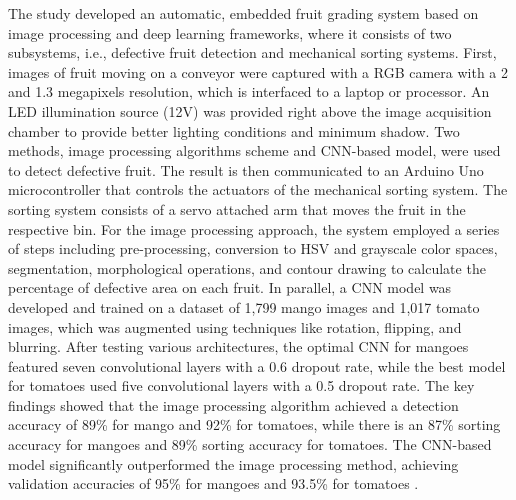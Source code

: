 {

The study developed an automatic, embedded fruit grading system based on image processing and deep learning frameworks, where it consists of two subsystems, i.e., defective fruit detection and mechanical sorting systems. First, images of fruit moving on a conveyor were captured with a RGB camera with a 2 and 1.3 megapixels resolution, which is interfaced to a laptop or processor. An LED illumination source (12V) was provided right above the image acquisition chamber to provide better lighting conditions and minimum shadow. Two methods, image processing algorithms scheme and CNN-based model, were used to detect defective fruit. The result is then communicated to an Arduino Uno microcontroller that controls the actuators of the mechanical sorting system. The sorting system consists of a servo attached arm that moves the fruit in the respective bin. For the image processing approach, the system employed a series of steps including pre-processing, conversion to HSV and grayscale color spaces, segmentation, morphological operations, and contour drawing to calculate the percentage of defective area on each fruit. In parallel, a CNN model was developed and trained on a dataset of 1,799 mango images and 1,017 tomato images, which was augmented using techniques like rotation, flipping, and blurring. After testing various architectures, the optimal CNN for mangoes featured seven convolutional layers with a 0.6 dropout rate, while the best model for tomatoes used five convolutional layers with a 0.5 dropout rate. The key findings showed that the image processing algorithm achieved a detection accuracy of 89\% for mango and 92\% for tomatoes, while there is an 87\% sorting accuracy for mangoes and 89\% sorting accuracy for tomatoes. The CNN-based model significantly outperformed the image processing method, achieving validation accuracies of  95\% for mangoes and 93.5\% for tomatoes \citep{amna2023machine}.

}
